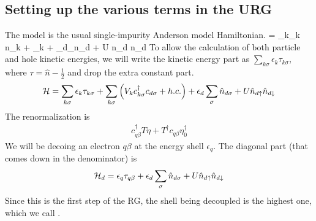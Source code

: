 \documentclass[12pt,twoside]{report}
\numberwithin{equation}{section}
\begin{document}
\subsection{Setting up the various terms in the URG}
The model is the usual single-impurity Anderson model Hamiltonian.
\beq
\ham = \sum_{k\sigma}\epsilon_k \hat n_{k\sigma} + \sum_{k\sigma}  + \epsilon_{d}\sum_\sigma  \hat n_{d\sigma} +  U \hat n_{d\ua} \hat n_{d\da}
\eeq
To allow the calculation of both particle and hole kinetic energies, we will write the kinetic energy part as \(\sum_{k\sigma}\epsilon_k \tau_{k\sigma}\), where \(\tau = \hat n - \frac{1}{2}\) and drop the extra constant part.
\begin{equation}
	\label{model:siam}
\mathcal{H} = \sum_{k\sigma}\epsilon_k \tau_{k\sigma} + \sum_{k\sigma} \left({V_{k} c^\dagger_{k\sigma} c_{d\sigma} + h.c.}\right) + \epsilon_{d}\sum_\sigma  \hat n_{d\sigma} +  U \hat n_{d\uparrow} \hat n_{d\downarrow}
\end{equation}
The renormalization is
\begin{equation}\begin{aligned}
\label{newh}
c^\dagger_{q\beta}T \eta + T^\dagger c_{q\beta}\eta_0^\dagger
\end{aligned}\end{equation}
We will be decoing an electron \(q\beta\) at the energy shell \(\epsilon_q\). The diagonal part (that comes down in the denominator) is
\begin{equation}\begin{aligned}
	\label{term1}
\mathcal{H}_d = \epsilon_q \tau_{q\beta} + \epsilon_{d}\sum_\sigma  \hat n_{d\sigma} +  U \hat n_{d\uparrow} \hat n_{d\downarrow}
\end{aligned}\end{equation}
Since this is the first step of the RG, the shell being decoupled is the highest one, which we call .
\end{document}
